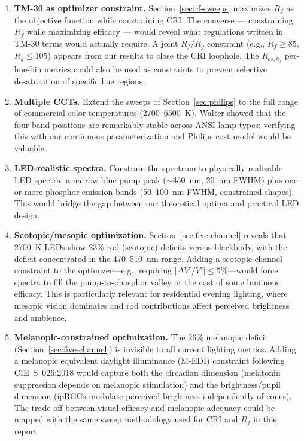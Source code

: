 \documentclass[11pt]{article}
\begin{document}
\begin{enumerate}
\item \textbf{TM-30 as optimizer constraint.}  Section~\ref{sec:rf-sweeps}
  maximizes $R_f$ as the objective function while constraining CRI.
  The converse --- constraining $R_f$ while maximizing efficacy ---
  would reveal what regulations written in TM-30 terms would actually
  require.  A joint $R_f$/$R_g$ constraint (e.g., $R_f \geq 85$,
  $R_g \leq 105$) appears from our results to close the CRI loophole.
  The $R_{cs,h_j}$ per-hue-bin metrics could also be used as
  constraints to prevent selective desaturation of specific hue regions.

\item \textbf{Multiple CCTs.}  Extend the sweeps of Section~\ref{sec:philips}
  to the full range of commercial color temperatures (2700--6500~K).
  Walter showed that the four-band positions are remarkably stable across
  ANSI lamp types; verifying this with our continuous parameterization
  and Philips cost model would be valuable.

\item \textbf{LED-realistic spectra.}  Constrain the spectrum to
  physically realizable LED spectra: a narrow blue pump peak
  ($\sim$450~nm, 20~nm FWHM) plus one or more phosphor emission bands
  (50--100~nm FWHM, constrained shapes).  This would bridge the gap
  between our theoretical optima and practical LED design.

\item \textbf{Scotopic/mesopic optimization.}  Section~\ref{sec:five-channel}
  reveals that 2700~K LEDs show 23\% rod (scotopic) deficits versus
  blackbody, with the deficit concentrated in the 470--510~nm range.
  Adding a scotopic channel constraint to the optimizer---e.g.,
  requiring $|\Delta V'/V'| \leq 5$\%---would force spectra to fill
  the pump-to-phosphor valley at the cost of some luminous efficacy.
  This is particularly relevant for residential evening lighting,
  where mesopic vision dominates and rod contributions affect perceived
  brightness and ambience.

\item \textbf{Melanopic-constrained optimization.}  The 26\% melanopic
  deficit (Section~\ref{sec:five-channel}) is invisible to all current
  lighting metrics.  Adding a melanopic equivalent daylight illuminance
  (M-EDI) constraint following CIE~S~026:2018 would capture both the
  circadian dimension (melatonin suppression depends on melanopic
  stimulation) and the brightness/pupil dimension (ipRGCs modulate
  perceived brightness independently of cones).  The trade-off between
  visual efficacy and melanopic adequacy could be mapped with the same
  sweep methodology used for CRI and $R_f$ in this report.


\end{enumerate}
\end{document}
